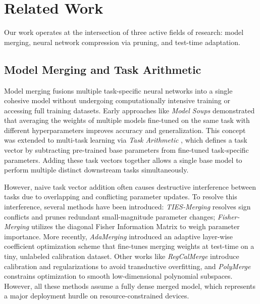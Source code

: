 \section{Related Work}
\label{sec:related_work}

Our work operates at the intersection of three active fields of research: model merging, neural network compression via pruning, and test-time adaptation. 

\subsection{Model Merging and Task Arithmetic}
Model merging fusions multiple task-specific neural networks into a single cohesive model without undergoing computationally intensive training or accessing full training datasets. Early approaches like \emph{Model Soups} \cite{wortsman2022model} demonstrated that averaging the weights of multiple models fine-tuned on the same task with different hyperparameters improves accuracy and generalization. This concept was extended to multi-task learning via \emph{Task Arithmetic} \cite{ilharco2023editing}, which defines a task vector by subtracting pre-trained base parameters from fine-tuned task-specific parameters. Adding these task vectors together allows a single base model to perform multiple distinct downstream tasks simultaneously.

However, naive task vector addition often causes destructive interference between tasks due to overlapping and conflicting parameter updates. To resolve this interference, several methods have been introduced: \emph{TIES-Merging} \cite{yadav2023ties} resolves sign conflicts and prunes redundant small-magnitude parameter changes; \emph{Fisher-Merging} \cite{matena2021merging} utilizes the diagonal Fisher Information Matrix to weigh parameter importance. More recently, \emph{AdaMerging} \cite{yang2024adamerging} introduced an adaptive layer-wise coefficient optimization scheme that fine-tunes merging weights at test-time on a tiny, unlabeled calibration dataset. Other works like \emph{RegCalMerge} \cite{daheim2023elastic} introduce calibration and regularizations to avoid transductive overfitting, and \emph{PolyMerge} \cite{sanford2023representing} constrains optimization to smooth low-dimensional polynomial subspaces. However, all these methods assume a fully dense merged model, which represents a major deployment hurdle on resource-constrained devices.

